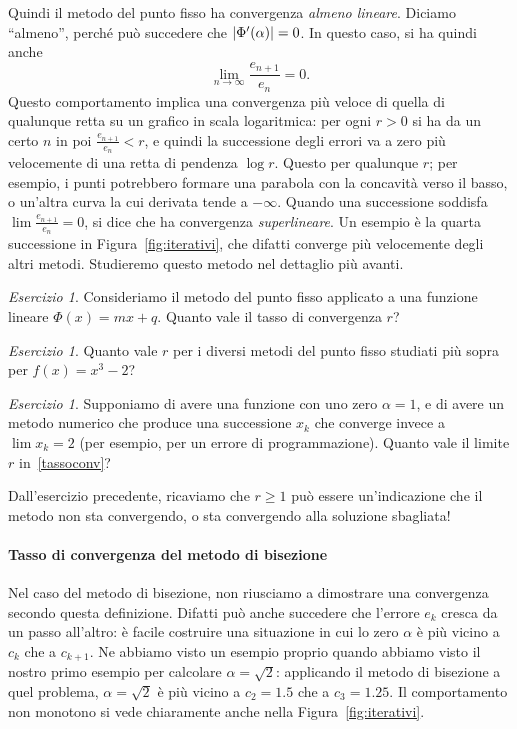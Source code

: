 \documentclass[a4paper]{report}
\DeclarePairedDelimiter{\abs}{\lvert}{\rvert}
\theoremstyle{definiton}
\theoremstyle{remark}
\newtheorem{esercizio}[theorem]{Esercizio}
\begin{document}
Quindi il metodo del punto fisso ha convergenza \emph{almeno lineare}. Diciamo ``almeno'', perché può succedere che $\abs{\Phi'(\alpha)} = 0$. In questo caso, si ha quindi anche
\[
    \lim_{n\to\infty} \frac{e_{n+1}}{e_n} = 0.
\]
Questo comportamento implica una convergenza più veloce di quella di qualunque retta su un grafico in scala logaritmica: per ogni $r>0$ si ha da un certo $n$ in poi $\frac{e_{n+1}}{e_n} < r$, e quindi la successione degli errori va a zero più velocemente di una retta di pendenza $\log r$. Questo per qualunque $r$; per esempio, i punti potrebbero formare una parabola con la concavità verso il basso, o un'altra curva la cui derivata tende a $-\infty$. Quando una successione soddisfa $\lim \frac{e_{n+1}}{e_n} = 0$, si dice che ha convergenza \emph{superlineare}. Un esempio è la quarta successione in Figura~\ref{fig:iterativi}, che difatti converge più velocemente degli altri metodi. Studieremo questo metodo nel dettaglio più avanti.

\begin{esercizio}
    Consideriamo il metodo del punto fisso applicato a una funzione lineare $\Phi(x) = mx + q$. Quanto vale il tasso di convergenza $r$?
\end{esercizio}
\begin{esercizio}
    Quanto vale $r$ per i diversi metodi del punto fisso studiati più sopra per $f(x) = x^3 - 2$?
\end{esercizio}
\begin{esercizio}
    Supponiamo di avere una funzione con uno zero $\alpha = 1$, e di avere un metodo numerico che produce una successione $x_k$ che converge invece a $\lim x_k = 2$ (per esempio, per un errore di programmazione). Quanto vale il limite $r$ in~\eqref{tassoconv}?
\end{esercizio}
Dall'esercizio precedente, ricaviamo che $r \geq 1$ può essere un'indicazione che il metodo non sta convergendo, o sta convergendo alla soluzione sbagliata!

\paragraph{Tasso di convergenza del metodo di bisezione}

Nel caso del metodo di bisezione, non riusciamo a dimostrare una convergenza secondo questa definizione. Difatti può anche succedere che l'errore $e_k$ cresca da un passo all'altro: è facile costruire una situazione in cui lo zero $\alpha$ è più vicino a $c_k$ che a $c_{k+1}$. Ne abbiamo visto un esempio proprio quando abbiamo visto il nostro primo esempio per calcolare $\alpha=\sqrt{2}$: applicando il metodo di bisezione a quel problema, $\alpha=\sqrt{2}$ è più vicino a $c_2=1.5$ che a $c_3=1.25$. Il comportamento non monotono si vede chiaramente anche nella Figura~\ref{fig:iterativi}.
\end{document}
